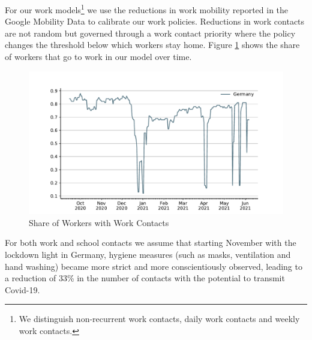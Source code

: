 For our work models\footnote{We distinguish non-recurrent work contacts, daily work
    contacts and weekly work contacts.} we use the reductions in work mobility reported in
the Google Mobility Data \citep{Google2021} to calibrate our work policies. Reductions in
work contacts are not random but governed through a work contact priority where the
policy changes the threshold below which workers stay home. Figure
\ref{fig:work_multiplier} shows the share of workers that go to work in our model over
time.

\begin{figure}[ht]
    \centering
    \includegraphics[width=\textwidth]{../figures/results/figures/data/work_multiplier_since_sep}
    \caption{Share of Workers with Work Contacts}
    \label{fig:work_multiplier}
\end{figure}

For both work and school contacts we assume that starting November with the lockdown
light in Germany, hygiene measures (such as masks, ventilation and hand washing) became
more strict and more conscientiously observed, leading to a reduction of 33\% in the number of contacts with the potential to transmit Covid-19.

